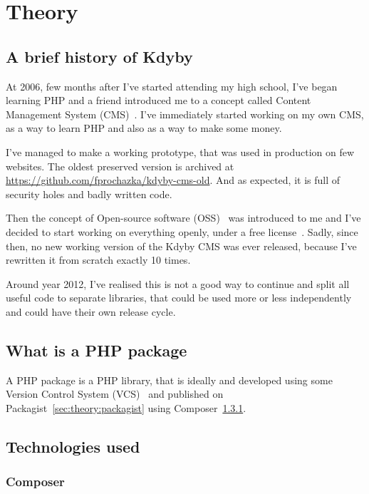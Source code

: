 \chapter{Theory}

\section{A brief history of Kdyby} \label{sec:theory:kdyby-history}

At 2006, few months after I've started attending my high school, I've began learning PHP and a friend introduced me to a concept called Content Management System (CMS)~\cite{wiki:cms}. I've immediately started working on my own CMS, as a way to learn PHP and also as a way to make some money.

I've managed to make a working prototype, that was used in production on few websites. The oldest preserved version is archived at \url{https://github.com/fprochazka/kdyby-cms-old}. And as expected, it is full of security holes and badly written code.

Then the concept of Open-source software (OSS)~\cite{wiki:oss} was introduced to me and I've decided to start working on everything openly, under a free license~\cite{wiki:fsl}. Sadly, since then, no new working version of the Kdyby CMS was ever released, because I've rewritten it from scratch exactly 10 times.

Around year 2012, I've realised this is not a good way to continue and split all useful code to separate libraries, that could be used more or less independently and could have their own release cycle.

\section{What is a PHP package} \label{sec:theory:what-is-a-package}

A PHP package is a PHP library, that is ideally and developed using some Version Control System (VCS)~\cite{wiki:vcs} and published on Packagist~\ref{sec:theory:packagist} using Composer~\ref{sec:theory:composer}.

\section{Technologies used}

\subsection{Composer} \label{sec:theory:composer}

